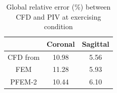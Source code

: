 \begin{table}[h!]
\caption {Global relative error (\%) between CFD and PIV at exercising condition} \label{tab:convergence}
\centering
\begin{tabular}{|c|c|c|}
\hline
       & Coronal & Sagittal \\ \hline
CFD from \cite{craven_cfd}  & 10.98	&5.56 \\ \hline
FEM    &  11.28    &  5.93  \\ \hline
PFEM-2 &  10.44   &  6.10     \\ \hline
\end{tabular}
\end{table}
